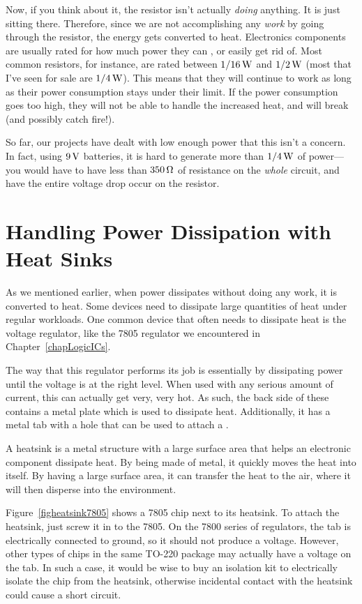 Now, if you think about it, the resistor isn't actually \emph{doing} anything.
It is just sitting there.
Therefore, since we are not accomplishing any \emph{work} by going through the resistor, the energy gets converted to heat.
Electronics components are usually rated for how much power they can , or easily get rid of.
Most common resistors, for instance, are rated between $1/16\,\si{\watt}$ and $1/2\,\si{\watt}$ (most that I've seen for sale are $1/4\,\si{\watt}$).  
This means that they will continue to work as long as their power consumption stays under their limit.
If the power consumption goes too high, they will not be able to handle the increased heat, and will break (and possibly catch fire!).

So far, our projects have dealt with low enough power that this isn't a concern.  
In fact, using $9\,\si{\volt}$ batteries, it is hard to generate more than $1/4\,\si{\watt}$ of power---you would have to have less than $350\,\si{\ohm}$ of resistance on the \emph{whole} circuit, and have the entire voltage drop occur on the resistor.

\section{Handling Power Dissipation with Heat Sinks}

As we mentioned earlier, when power dissipates without doing any work, it is converted to heat.
Some devices need to dissipate large quantities of heat under regular workloads.
One common device that often needs to dissipate heat is the voltage regulator, like the 7805 regulator we encountered in Chapter~\ref{chapLogicICs}.

The way that this regulator performs its job is essentially by dissipating power until the voltage is at the right level.
When used with any serious amount of current, this can actually get very, very hot.
As such, the back side of these contains a metal plate which is used to dissipate heat.
Additionally, it has a metal tab with a hole that can be used to attach a .

A heatsink is a metal structure with a large surface area that helps an electronic component dissipate heat.
By being made of metal, it quickly moves the heat into itself.
By having a large surface area, it can transfer the heat to the air, where it will then disperse into the environment.


Figure~\ref{figheatsink7805} shows a 7805 chip next to its heatsink.
To attach the heatsink, just screw it in to the 7805.
On the 7800 series of regulators, the tab is electrically connected to ground, so it should not produce a voltage.
However, other types of chips in the same TO-220 package may actually have a voltage on the tab. 
In such a case, it would be wise to buy an isolation kit to electrically isolate the chip from the heatsink, otherwise incidental contact with the heatsink could cause a short circuit.

